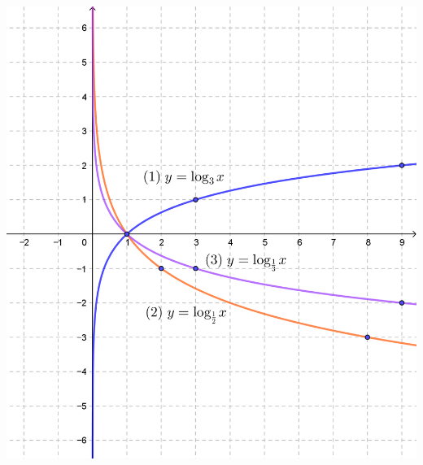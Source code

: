 \documentclass{oblivoir}
\begin{document}
\begin{multicols*}{2}
%
\begin{center}
\includegraphics[width=\columnwidth]{log_3}
\end{center}


\end{multicols*}
\end{document}
